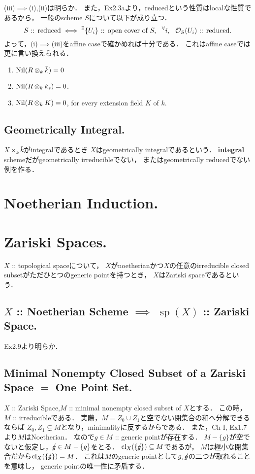\documentclass[a4paper]{jsarticle}
\newcommand{\shO}{\mathcal{O}}
\newcommand{\basesp}{\operatorname{sp}}
\newcommand{\mnot}{/\hspace{-1.2ex}}
\begin{document}
    (iii)$\implies$(i),(ii)は明らか．
    また，Ex2.3aより，reducedという性質はlocalな性質であるから，
    一般のscheme $S$について以下が成り立つ．
    \[
        S\text{ :: reduced}
        \iff
        \Exists{\{U_i\}\text{ :: open cover of }S}
        \Forall{i} \shO_S(U_i)\text{ :: reduced.}
    \]
    よって，(i)$\implies$(iii)をaffine caseで確かめれば十分である．
    これはaffine caseでは更に言い換えられる．
    \begin{enumerate}[label=(\roman*)]
        \item $\operatorname{Nil}(R \otimes_k \bar{k})=0$
        \item $\operatorname{Nil}(R \otimes_k k_s)=0$.
        \item $\operatorname{Nil}(R \otimes_k K)=0$, for every extension field $K$ of $k$.
    \end{enumerate}

    \subsection{Geometrically Integral.}
    $X \times_k \bar{k}$がintegralであるとき
    $X$はgeometrically integralであるという．
    \textbf{integral} schemeだがgeometrically irreducibleでない，
    またはgeometrically reducedでない例を作る．

\section{Noetherian Induction.} %

\section{Zariski Spaces.} %
    $X$ :: topological spaceについて，
    $X$がnoetherianかつ$X$の任意のirreducible closed subsetがただひとつのgeneric pointを持つとき，
    $X$はZariski spaceであるという．

    \subsection{$X$ :: Noetherian Scheme $\implies$ $\basesp(X)$ :: Zariski Space.}
    Ex2.9より明らか．

    \subsection{Minimal Nonempty Closed Subset of a Zariski Space $=$ One Point Set.}
    $X$ :: Zariski Space,$M$ :: minimal nonempty closed subset of $X$とする．
    この時，$M$ :: irreducibleである．
    実際，$M=Z_0 \cup Z_1$と空でない閉集合の和へ分解できるならば
    $Z_0,Z_1 \subsetneq M$となり，minimalityに反するからである．
    また，Ch I, Ex1.7より$M$はNoetherian．
    なので$g \in M$ :: generic pointが存在する．
    $M-\{g\}$が空でないと仮定し，$\mnot g \in M-\{g\}$をとる．
    $\cl_X(\{\mnot g\}) \subseteq M$であるが，
    $M$は極小な閉集合だから$\cl_X(\{\mnot g\})=M$．
    これは$M$のgeneric pointとして$g, \mnot g$の二つが取れることを意味し，
    generic pointの唯一性に矛盾する．
\end{document}
